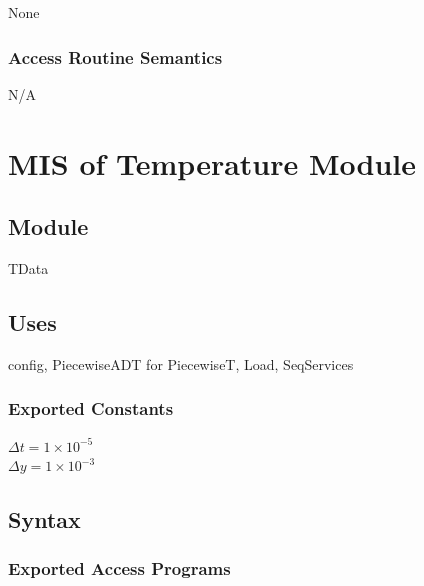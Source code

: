 \documentclass[12pt, titlepage]{article}
\begin{document}
None

\subsubsection{Access Routine Semantics}

N/A

\newpage

\section{MIS of Temperature Module} \label{temp}

\subsection{Module}

TData

\subsection{Uses}

config, PiecewiseADT for PiecewiseT, Load, SeqServices

\subsubsection* {Exported Constants}

$\Delta t = 1 \times 10^{-5}$\\ %
$\Delta y = 1 \times 10^{-3}$

\subsection{Syntax}

\subsubsection{Exported Access Programs}
\end{document}
